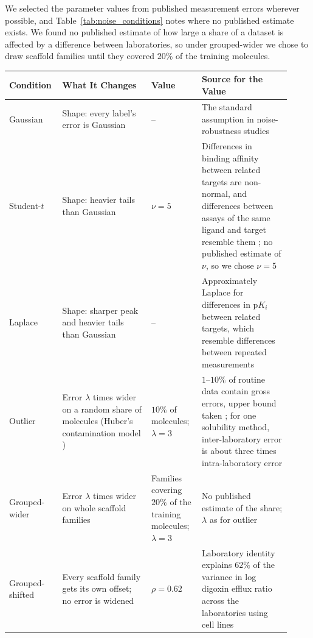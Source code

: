 We selected the parameter values from published measurement errors wherever possible, and Table~\ref{tab:noise_conditions} notes where no published estimate exists. We found no published estimate of how large a share of a dataset is affected by a difference between laboratories, so under grouped-wider we chose to draw scaffold families until they covered $20\%$ of the training molecules.
\begin{table}[htbp]
\centering
\small
\begin{adjustbox}{max width=\textwidth,max totalheight=0.78\textheight}
\begin{tabular}{@{}P{0.15\linewidth}P{0.30\linewidth}P{0.17\linewidth}P{0.30\linewidth}@{}}
\toprule
\textbf{Condition} & \textbf{What It Changes} & \textbf{Value} & \textbf{Source for the Value} \\
\midrule
Gaussian & Shape: every label's error is Gaussian & -- & The standard assumption in noise-robustness studies \\
Student-$t$ & Shape: heavier tails than Gaussian & $\nu = 5$ & Differences in binding affinity between related targets are non-normal, and differences between assays of the same ligand and target resemble them \citep{Kruger2012}; no published estimate of $\nu$, so we chose $\nu = 5$ \\
Laplace & Shape: sharper peak and heavier tails than Gaussian & -- & Approximately Laplace for differences in p$K_i$ between related targets, which resemble differences between repeated measurements \citep{Kruger2012} \\
Outlier & Error $\lambda$ times wider on a random share of molecules (Huber's contamination model \citep{Huber1964}) & $10\%$ of molecules; $\lambda = 3$ & $1$--$10\%$ of routine data contain gross errors, upper bound taken \citep{Hampel2001}; for one solubility method, inter-laboratory error is about three times intra-laboratory error \citep{Avdeef2019} \\
Grouped-wider & Error $\lambda$ times wider on whole scaffold families & Families covering $20\%$ of the training molecules; $\lambda = 3$ & No published estimate of the share; $\lambda$ as for outlier \citep{Avdeef2019} \\
Grouped-shifted & Every scaffold family gets its own offset; no error is widened & $\rho = 0.62$ & Laboratory identity explains $62\%$ of the variance in log digoxin efflux ratio across the laboratories using cell lines \citep{Bentz2013} \\

\end{tabular}
\end{adjustbox}
\end{table}
